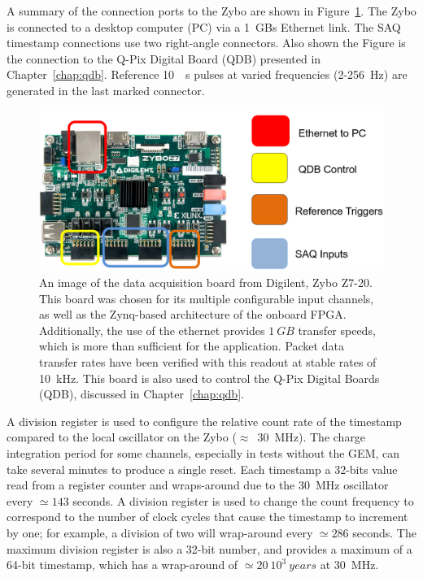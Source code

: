 A summary of the connection ports to the Zybo are shown in Figure~\ref{fig:saq_zybo}.
The Zybo is connected to a desktop computer (PC) via a 1~\unit{GBs} Ethernet link.
The SAQ timestamp connections use two right-angle connectors.
Also shown the Figure is the connection to the Q-Pix Digital Board (QDB) presented in Chapter~\ref{chap:qdb}.
Reference 10~\unit{\mu s} pulses at varied frequencies (2-256~\unit{Hz}) are generated in the last marked connector.

\begin{figure}[]
\centering
\includegraphics[width=\textwidth]{images/saq_zybo_io_summary.png}
\caption{An image of the data acquisition board from Digilent, Zybo Z7-20. 
This board was chosen for its multiple configurable input channels, as well as the Zynq-based architecture of the onboard FPGA.
Additionally, the use of the ethernet provides $1~\unit{GB}$ transfer speeds, which is more than sufficient for the application.
Packet data transfer rates have been verified with this readout at stable rates of 10~\unit{kHz}.
This board is also used to control the Q-Pix Digital Boards (QDB), discussed in Chapter~\ref{chap:qdb}.
}
\label{fig:saq_zybo}
\end{figure}

A division register is used to configure the relative count rate of the timestamp compared to the local oscillator on the Zybo ($\approx$~30~\unit{MHz}).
The charge integration period for some channels, especially in tests without the GEM, can take several minutes to produce a single reset.
Each timestamp a 32-bits value read from a register counter and wraps-around due to the 30~\unit{MHz} oscillator every $\simeq 143$ seconds.
A division register is used to change the count frequency to correspond to the number of clock cycles that cause the timestamp to increment by one; for example, a division of two will wrap-around every $\simeq 286$ seconds.
The maximum division register is also a 32-bit number, and provides a maximum of a 64-bit timestamp, which has a wrap-around of $\simeq 20~10^3 ~\unit{years}$ at 30~\unit{MHz}.

